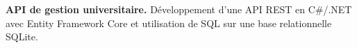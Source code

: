 
\begin{cvparagraph}
\noindent\textbf{API de gestion universitaire.} Développement d’une API REST en C\#/.NET avec Entity Framework Core et utilisation de SQL sur une base relationnelle SQLite.
\end{cvparagraph}

